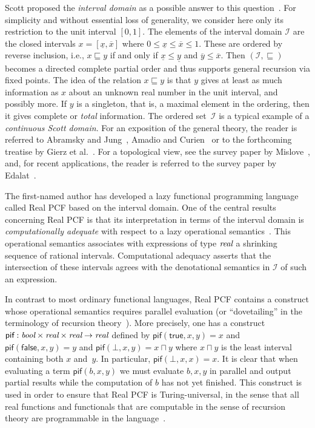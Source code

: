 \documentclass[12pt]{article}
\newcommand{\I}{\mathcal{I}}
\begin{document}
Scott proposed the \emph{interval domain} as a possible answer to this
question~\cite{scott:intervaldomain}. For simplicity and without
essential loss of generality, we consider here only its restriction to
the unit interval $[0,1]$. The elements of the interval domain
$\mathcal{I}$ are the closed intervals $x=[\underline
x,\overline x]$ where $0\leq \underline x\leq \overline x\leq 1$.
These are ordered by reverse inclusion, i.e., $x\sqsubseteq y$ if and
only if $\underline x\leq \underline y$ and $\overline y\leq\overline
x$.  Then $(\mathcal{I},\sqsubseteq)$ becomes a directed complete
partial order and thus supports general recursion via fixed points.
The idea of the relation $x \sqsubseteq y$ is that $y$ gives at least
as much information as $x$ about an unknown real number in the unit
interval, and possibly more.  If $y$ is a singleton, that is, a
maximal element in the ordering, then it gives complete or
\emph{total} information.  The ordered set~$\I$ is a typical example
of a \emph{continuous Scott domain}.  For an exposition of the general
theory, the reader is referred to Abramsky and
Jung~\cite{abramsky:jung}, Amadio and Curien~\cite{amadio:curien} or
to the forthcoming treatise by Gierz et al.~\cite{newcompendium}.  For
a topological view, see the survey paper by
Mislove~\cite{mislove:survey}, and, for recent applications, the
reader is referred to the survey paper by Edalat~\cite{Eda97}.

The first-named author has developed a lazy functional programming
language called Real PCF based on the interval domain. One of the
central results concerning Real PCF is that its interpretation in
terms of the interval domain is \emph{computationally adequate} with
respect to a lazy operational semantics~\cite{escardo:pcf}.  This
operational semantics associates with expressions of type $\textit{real}$ a
shrinking sequence of rational intervals.  Computational adequacy
asserts that the intersection of these intervals agrees with the
denotational semantics in $\mathcal{I}$ of such an expression.

In contrast to most ordinary functional languages, Real PCF contains a
construct whose operational semantics requires parallel evaluation (or
``dovetailing'' in the terminology of recursion theory~\cite{rogers}).
More precisely, one has a construct
$\textsf{pif}:\textit{bool}\times\textit{real}\times\textit{real}\rightarrow\textit{real}$ defined by
$\textsf{pif}(\textsf{true},x,y)=x$ and
$\textsf{pif}(\textsf{false},x,y)=y$ and
$\textsf{pif}(\bot,x,y)=x\sqcap y$ where $x\sqcap y$ is the least
interval containing both $x$ and~$y$. In particular,
$\textsf{pif}(\bot,x,x)=x$.  It is clear that when evaluating a term
$\textsf{pif}(b,x,y)$ we must evaluate $b,x,y$ in parallel and output
partial results while the computation of $b$ has not yet finished.
This construct is used in order to ensure that Real PCF is
Turing-universal, in the sense that all real functions and functionals
that are computable in the sense of recursion theory are programmable
in the language~\cite{MR2000b:03216}.
\end{document}
